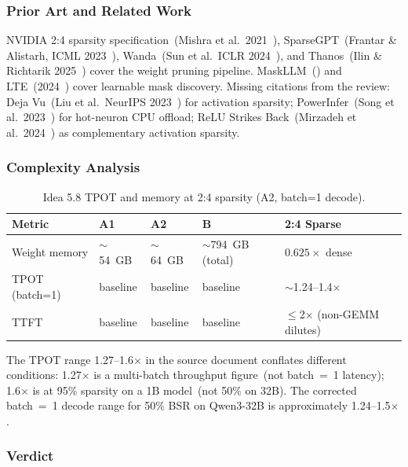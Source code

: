 \documentclass[11pt]{article}
\begin{document}
\subsubsection*{Prior Art and Related Work}

NVIDIA 2:4 sparsity specification~(Mishra et al.\ 2021~\cite{MishraNMSparsity2021}), SparseGPT~(Frantar \& Alistarh, ICML 2023~\cite{FrantarSparseGPT2023}), Wanda~(Sun et al.\ ICLR 2024~\cite{SunWanda2024}), and Thanos~(Ilin \& Richtarik 2025~\cite{IlinThanos2025}) cover the weight pruning pipeline. MaskLLM~(\cite{FangMaskLLM2024}) and LTE~(2024~\cite{LTE2024}) cover learnable mask discovery. Missing citations from the review: Deja Vu~(Liu et al.\ NeurIPS 2023~\cite{LiuDejaVu2023}) for activation sparsity; PowerInfer~(Song et al.\ 2023~\cite{SongPowerInfer2023}) for hot-neuron CPU offload; ReLU Strikes Back~(Mirzadeh et al.\ 2024~\cite{MirzadehReLU2024}) as complementary activation sparsity.

\subsubsection*{Complexity Analysis}

\begin{table}[h]
\centering
\caption{Idea 5.8 TPOT and memory at 2:4 sparsity (A2, batch=1 decode).}
\small
\begin{tabular}{lllll}
\toprule
Metric & A1 & A2 & B & 2:4 Sparse \\
\midrule
Weight memory & $\sim$54~GB & $\sim$64~GB & $\sim$794~GB (total) & $0.625\times$ dense \\
TPOT (batch=1) & baseline & baseline & baseline & $\sim$1.24--1.4$\times$ \\
TTFT & baseline & baseline & baseline & $\leq$2$\times$ (non-GEMM dilutes) \\
\bottomrule
\end{tabular}
\end{table}

The TPOT range 1.27--1.6$\times$ in the source document conflates different conditions: 1.27$\times$ is a multi-batch throughput figure~(not batch~=~1 latency); 1.6$\times$ is at 95\% sparsity on a 1B model~(not 50\% on 32B). The corrected batch~=~1 decode range for 50\% BSR on Qwen3-32B is approximately 1.24--1.5$\times$.

\subsubsection*{Verdict}
\end{document}
